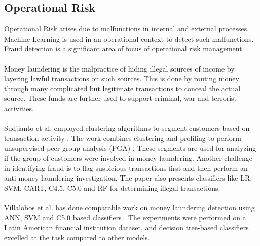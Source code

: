 \documentclass[a4paper, 12pt]{article}
\begin{document}
\subsection{Operational Risk}
\noindent Operational Risk arises due to malfunctions in internal and external processes. Machine Learning is used in an operational context to detect such malfunctions. Fraud detection is a significant area of focus of operational risk management.
\\
\\
\noindent Money laundering is the malpractice of hiding illegal sources of income by layering lawful transactions on such sources. This is done by routing money through many complicated but legitimate transactions to conceal the actual source. These funds are further used to support criminal, war and terrorist activities.
\\
\\
\noindent Sudjianto et al. employed clustering algorithms to segment customers based on transaction activity \cite{sudjianto2010statistical}. The work combines clustering and profiling to perform unsupervised peer group analysis (PGA) \cite{bolton2001peer}. These segments are used for analyzing if the group of customers were involved in money laundering. Another challenge in identifying fraud is to flag suspicious transactions first and then perform an anti-money laundering investigation. The paper also presents classifiers like LR, SVM, CART, C4.5, C5.0 and RF for determining illegal transactions.
\\
\\
\noindent Villalobos et al. has done comparable work on money laundering detection using ANN, SVM and C5.0 based classifiers \cite{villalobos2017statistical}. The experiments were performed on a Latin American financial institution dataset, and decision tree-based classifiers excelled at the task compared to other models. 
\end{document}
